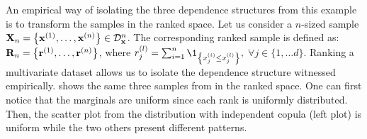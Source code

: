 An empirical way of isolating the three dependence structures from this example is to transform the samples in the ranked space. 
Let us consider a $n$-sized sample ${\bf X}_n = \left\{{\bf x}^{(1)}, \dots, {\bf x}^{(n)}\right\} \in \mathcal{D}_{{\bf x}}^{n}$. 
The corresponding ranked sample is defined as: ${\bf R}_n = \left\{{\bf r}^{(1)}, \dots, {\bf r}^{(n)}\right\}$, 
where $r^{(l)}_j = \sum_{i=1}^n \1_{\left\{x^{(i)}_j \leq x^{(l)}_j\right\}},$ $\forall j \in \{1, \dots d\}$.
Ranking a multivariate dataset allows us to isolate the dependence structure witnessed empirically. 
 shows the same three samples from  in the ranked space.
One can first notice that the marginals are uniform since each rank is uniformly distributed. 
Then, the scatter plot from the distribution with independent copula (left plot) is uniform while the two others present different patterns. 
